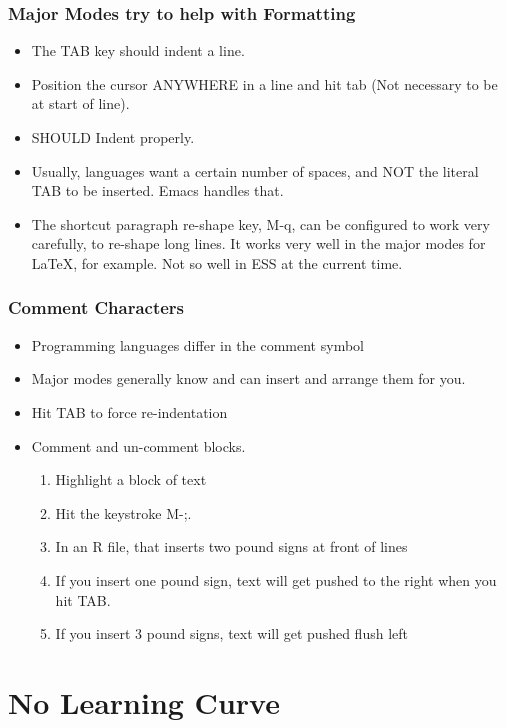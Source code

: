 \documentclass[11pt,english]{beamer}
\begin{document}
\begin{frame}[containsverbatim]
  \frametitle{Major Modes try to help with Formatting}
  \begin{itemize}
    \item The TAB key should indent a line.
    \item Position the cursor ANYWHERE in a line and hit tab (Not
      necessary to be at start of line).
    \item SHOULD Indent properly.
    \item Usually, languages want a certain number of spaces, and NOT
      the literal TAB to be inserted. Emacs handles that.
    \item The shortcut paragraph re-shape key, M-q, can be configured
      to work very carefully, to re-shape long lines.  It works very
      well in the major modes for LaTeX, for example. Not so well in
      ESS at the current time.
   \end{itemize}
\end{frame}


\begin{frame}[containsverbatim]
  \frametitle{Comment Characters}
  \begin{itemize}
      \item Programming languages differ in the comment symbol
      \item Major modes generally know and can insert and arrange them
        for you.
      \item Hit TAB to force re-indentation
      \item Comment and un-comment blocks.
        \begin{enumerate}
          \item Highlight a block of text
          \item Hit the keystroke M-;. 
          \item In an R file, that inserts two pound signs at front of
            lines
          \item If you insert one pound sign, text will get pushed to the
            right when you hit TAB.
          \item If you insert 3 pound signs, text will get pushed
            flush left
       \end{enumerate}
  \end{itemize}
\end{frame}

\section{No Learning Curve}
\end{document}
